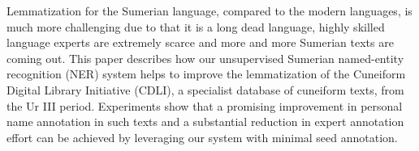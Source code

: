 Lemmatization for the Sumerian language, compared to the modern languages, is much more challenging due to that it is a long dead language, highly skilled language experts are extremely scarce and more and more Sumerian texts are coming out. This paper describes how our unsupervised Sumerian named-entity recognition (NER) system helps to improve the lemmatization of the Cuneiform Digital Library Initiative (CDLI), a specialist database of cuneiform texts, from the Ur III period. Experiments show that a promising improvement in personal name annotation in such texts and a substantial reduction in expert annotation effort can be achieved by leveraging our system with minimal seed annotation.
